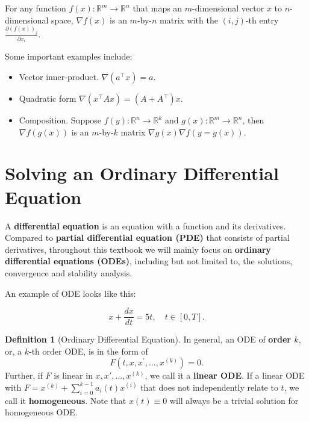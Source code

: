\documentclass[
]{book}
\theoremstyle{definition}
\newtheorem{definition}{Definition}[chapter]
\theoremstyle{definition}
\theoremstyle{definition}
\theoremstyle{definition}
\theoremstyle{remark}
\begin{document}
For any function \(f(x):\mathbb{R}^{m}\rightarrow \mathbb{R}^n\) that maps an \(m\)-dimensional vector \(x\) to \(n\)-dimensional space, \(\nabla f(x)\) is an \(m\)-by-\(n\) matrix with the \((i,j)\)-th entry \(\frac{\partial (f(x))_j}{\partial x_i}\).

Some important examples include:

\begin{itemize}
\item
  Vector inner-product. \(\nabla(a^\top x)=a\).
\item
  Quadratic form \(\nabla(x^\top Ax) = (A+A^\top)x\).
\item
  Composition. Suppose \(f(y):\mathbb{R}^{n}\rightarrow \mathbb{R}^k\) and \(g(x):\mathbb{R}^{m}\rightarrow \mathbb{R}^n\), then \(\nabla f(g(x))\) is an \(m\)-by-\(k\) matrix \(\nabla g(x) \nabla f(y=g(x))\).
\end{itemize}

\hypertarget{solving-an-ordinary-differential-equation}{%
\section{Solving an Ordinary Differential Equation}\label{solving-an-ordinary-differential-equation}}

A \textbf{differential equation} is an equation with a function and its derivatives. Compared to \textbf{partial differential equation (PDE)} that consists of partial derivatives, throughout this textbook we will mainly focus on \textbf{ordinary differential equations (ODEs)}, including but not limited to, the solutions, convergence and stability analysis.

An example of ODE looks like this:

\begin{equation}
x+\frac{dx}{dt}=5t,\quad t\in[0,T].
\label{eq:app-ode-example}
\end{equation}

\begin{definition}[Ordinary Differential Equation]
\protect\hypertarget{def:ode}{}\label{def:ode}In general, an ODE of \textbf{order \(k\)}, or, a \(k\)-th order ODE, is in the form of
\[ F(t, x, x^\prime, \ldots, x^{(k)})=0.\]
Further, if \(F\) is linear in \(x,x',\ldots,x^{(k)}\), we call it a \textbf{linear ODE}. If a linear ODE with \(F=x^{(k)} + \sum_{i=0}^{k-1}a_i(t)x^{(i)}\) that does not independently relate to \(t\), we call it \textbf{homogeneous}. Note that \(x(t)\equiv 0\) will always be a trivial solution for homogeneous ODE.
\end{definition}
\end{document}
